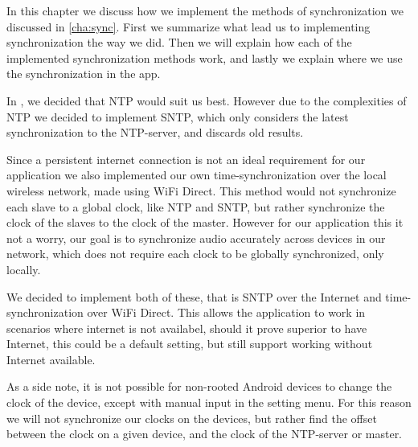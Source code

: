 In this chapter we discuss how we implement the methods of synchronization we discussed in \cref{cha:sync}.
First we summarize what lead us to implementing synchronization the way we did.
Then we will explain how each of the implemented synchronization methods work, and lastly we explain where we use the synchronization in the app.

In , we decided that \ac{NTP} would suit us best.
However due to the complexities of \ac{NTP} we decided to implement \ac{SNTP}, which only considers the latest synchronization to the \ac{NTP}-server, and discards old results.

Since a persistent internet connection is not an ideal requirement for our application we also implemented our own time-synchronization over the local wireless network, made using WiFi Direct.
This method would not synchronize each slave to a global clock, like \ac{NTP} and \ac{SNTP}, but rather synchronize the clock of the slaves to the clock of the master.
However for our application this it not a worry, our goal is to synchronize audio accurately across devices in our network, which does not require each clock to be globally synchronized, only locally.

We decided to implement both of these, that is \ac{SNTP} over the Internet and time-synchronization over WiFi Direct.
This allows the application to work in scenarios where internet is not availabel, should it prove superior to have Internet, this could be a default setting, but still support working without Internet available.

As a side note, it is not possible for non-rooted Android devices to change the clock of the device, except with manual input in the setting menu.
For this reason we will not synchronize our clocks on the devices, but rather find the offset between the clock on a given device, and the clock of the \ac{NTP}-server or master.
